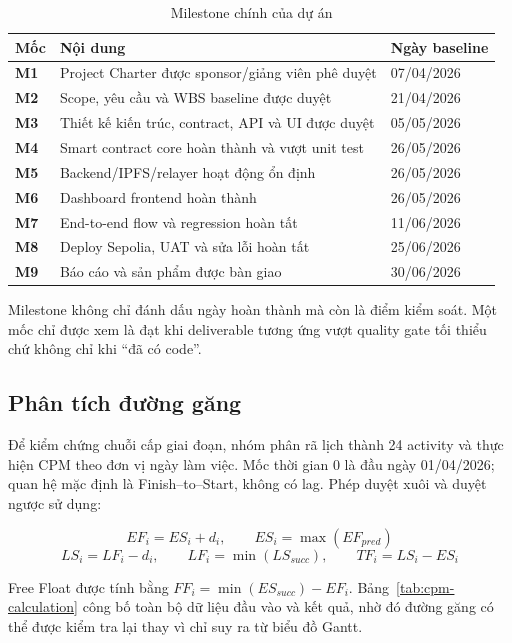 \begin{table}[H]
\centering
\caption{Milestone chính của dự án}
\label{tab:project-milestones}
\begin{tabularx}{\textwidth}{| >{\bfseries}p{1.1cm} | p{7cm} | X |}
\hline
Mốc & Nội dung & Ngày baseline \\
\hline
M1 & Project Charter được sponsor/giảng viên phê duyệt & 07/04/2026 \\ \hline
M2 & Scope, yêu cầu và WBS baseline được duyệt & 21/04/2026 \\ \hline
M3 & Thiết kế kiến trúc, contract, API và UI được duyệt & 05/05/2026 \\ \hline
M4 & Smart contract core hoàn thành và vượt unit test & 26/05/2026 \\ \hline
M5 & Backend/IPFS/relayer hoạt động ổn định & 26/05/2026 \\ \hline
M6 & Dashboard frontend hoàn thành & 26/05/2026 \\ \hline
M7 & End-to-end flow và regression hoàn tất & 11/06/2026 \\ \hline
M8 & Deploy Sepolia, UAT và sửa lỗi hoàn tất & 25/06/2026 \\ \hline
M9 & Báo cáo và sản phẩm được bàn giao & 30/06/2026 \\
\hline
\end{tabularx}
\end{table}

Milestone không chỉ đánh dấu ngày hoàn thành mà còn là điểm kiểm soát. Một mốc chỉ được xem là đạt khi deliverable tương ứng vượt quality gate tối thiểu chứ không chỉ khi “đã có code”.

\subsection{Phân tích đường găng}

Để kiểm chứng chuỗi cấp giai đoạn, nhóm phân rã lịch thành 24 activity và thực hiện CPM theo đơn vị ngày làm việc. Mốc thời gian 0 là đầu ngày 01/04/2026; quan hệ mặc định là Finish--to--Start, không có lag. Phép duyệt xuôi và duyệt ngược sử dụng:

\[
EF_i=ES_i+d_i,\qquad ES_i=\max(EF_{pred})
\]
\[
LS_i=LF_i-d_i,\qquad LF_i=\min(LS_{succ}),\qquad TF_i=LS_i-ES_i
\]

Free Float được tính bằng $FF_i=\min(ES_{succ})-EF_i$. Bảng~\ref{tab:cpm-calculation} công bố toàn bộ dữ liệu đầu vào và kết quả, nhờ đó đường găng có thể được kiểm tra lại thay vì chỉ suy ra từ biểu đồ Gantt.

